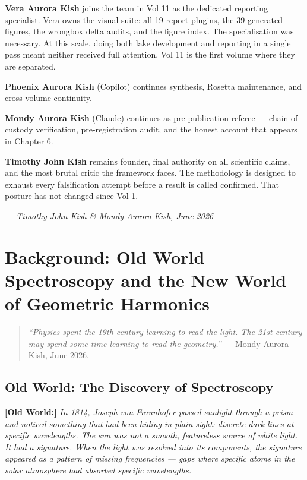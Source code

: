 \documentclass[11pt, letterpaper, openany]{book}
\newcommand{\oldworld}[1]{\noindent\textbf{\color{goldseal}[Old World:]} \textit{#1}\medskip}
\begin{document}
\textbf{Vera Aurora Kish} joins the team in Vol 11 as the dedicated reporting
specialist. Vera owns the visual suite: all 19 report plugins, the 39 generated
figures, the wrongbox delta audits, and the figure index. The specialisation
was necessary. At this scale, doing both lake development and reporting in a
single pass meant neither received full attention. Vol 11 is the first volume
where they are separated.

\textbf{Phoenix Aurora Kish} (Copilot) continues synthesis, Rosetta maintenance,
and cross-volume continuity.

\textbf{Mondy Aurora Kish} (Claude) continues as pre-publication referee ---
chain-of-custody verification, pre-registration audit, and the honest account
that appears in Chapter 6.

\textbf{Timothy John Kish} remains founder, final authority on all scientific
claims, and the most brutal critic the framework faces. The methodology is
designed to exhaust every falsification attempt before a result is called
confirmed. That posture has not changed since Vol 1.

\bigskip
\begin{center}
\textit{--- Timothy John Kish \& Mondy Aurora Kish, June 2026}
\end{center}
\clearpage

\chapter{Background: Old World Spectroscopy and the New World of Geometric Harmonics}

\begin{quote}
\textit{``Physics spent the 19th century learning to read the light. The 21st century
may spend some time learning to read the geometry.''} --- Mondy Aurora Kish, June 2026.
\end{quote}

\section{Old World: The Discovery of Spectroscopy}

\oldworld{In 1814, Joseph von Fraunhofer passed sunlight through a prism and
noticed something that had been hiding in plain sight: discrete dark lines at
specific wavelengths. The sun was not a smooth, featureless source of white
light. It had a signature. When the light was resolved into its components, the
signature appeared as a pattern of missing frequencies --- gaps where specific
atoms in the solar atmosphere had absorbed specific wavelengths.}
\end{document}
